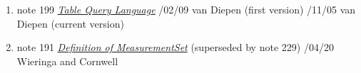 \begin{enumerate}
\item
note 199
\href{199.html}{\textit{Table Query Language}}
/02/09 van Diepen (first version)
/11/05 van Diepen (current version)

\item
note 191
\href{191.html}{\textit{Definition of MeasurementSet}} (superseded by
  note 229)
/04/20 Wieringa and Cornwell

\end{enumerate}
